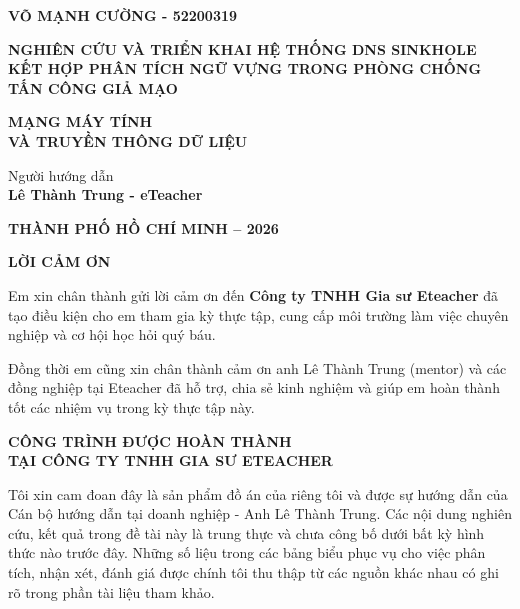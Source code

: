 \documentclass[13pt,a4paper]{extreport}
\begin{document}
\begin{center}
    \fontsize{18pt}{18pt}\selectfont
    \textbf{VÕ MẠNH CƯỜNG - 52200319}
\end{center}
\vspace{1cm}
\begin{center}\LARGE
    \textbf{\MakeUppercase{Nghiên cứu và triển khai hệ thống DNS Sinkhole kết hợp phân tích ngữ vựng trong phòng chống tấn công giả mạo}}	
\end{center}
\vspace{1cm}
\begin{center}
\fontsize{20pt}{18pt}\selectfont
    \textbf{\MakeUppercase{MẠNG MÁY TÍNH\\VÀ TRUYỀN THÔNG DỮ LIỆU}} 
\end{center}

\vspace{1.5cm}
\fontsize{16pt}{16pt}\selectfont
\begin{center}
    Người hướng dẫn\\
    \fontsize{18pt}{16pt}\selectfont
    \textbf{Lê Thành Trung - eTeacher}
\end{center}
\vspace{1cm}
\begin{center}
    \textbf{THÀNH PHỐ HỒ CHÍ MINH – 2026}
\end{center}
\clearpage

\pagestyle{plain}
\setcounter{page}{1}
\fontsize{15pt}{18pt}\selectfont
\begin{center}\fontsize{16pt}{18pt}
    \textbf{LỜI CẢM ƠN}	
\end{center}
Em xin chân thành gửi lời cảm ơn đến \textbf{Công ty TNHH Gia sư Eteacher} đã tạo điều kiện cho em tham gia kỳ thực tập, cung cấp môi trường làm việc chuyên nghiệp và cơ hội học hỏi quý báu. 

Đồng thời em cũng xin chân thành cảm ơn anh Lê Thành Trung (mentor) và các đồng nghiệp tại Eteacher đã hỗ trợ, chia sẻ kinh nghiệm và giúp em hoàn thành tốt các nhiệm vụ trong kỳ thực tập này.


\newpage

\begin{center}\fontsize{16pt}{18pt}
    \textbf{CÔNG TRÌNH ĐƯỢC HOÀN THÀNH \\ TẠI CÔNG TY TNHH GIA SƯ ETEACHER}
\end{center}

Tôi xin cam đoan đây là sản phẩm đồ án của riêng tôi và được sự hướng dẫn của Cán bộ hướng dẫn tại doanh nghiệp - Anh Lê Thành Trung. Các nội dung nghiên cứu, kết quả trong đề tài này là trung thực và chưa công bố dưới bất kỳ hình thức nào trước đây. Những số liệu trong các bảng biểu phục vụ cho việc phân tích, nhận xét, đánh giá được chính tôi thu thập từ các nguồn khác nhau có ghi rõ trong phần tài liệu tham khảo.
\end{document}

